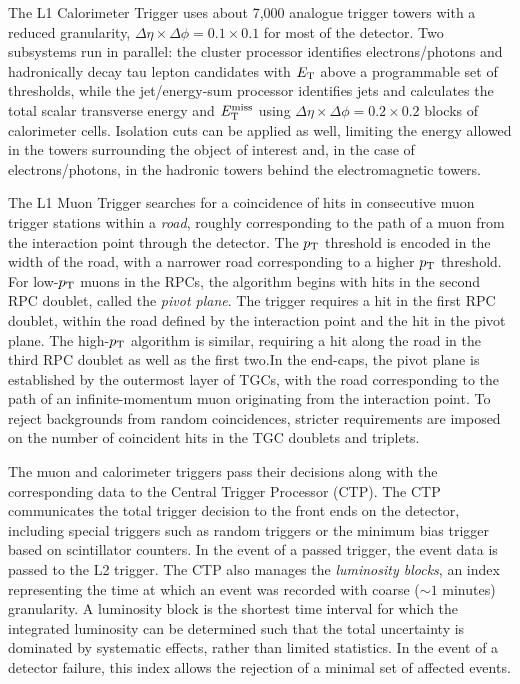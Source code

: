 The L1 Calorimeter Trigger uses about 7,000 analogue trigger towers with a reduced granularity, $\Delta\eta\times\Delta\phi=0.1\times0.1$ for most of the detector. Two subsystems run in parallel: the cluster processor identifies electrons/photons and hadronically decay tau lepton candidates with $E_{\mathrm{T}}$ above a programmable set of thresholds, while the jet/energy-sum processor identifies jets and calculates the total scalar transverse energy and $E_{\text{T}}^{\text{miss}}$ using $\Delta\eta\times\Delta\phi=0.2\times0.2$ blocks of calorimeter cells. Isolation cuts can be applied as well, limiting the energy allowed in the towers surrounding the object of interest and, in the case of electrons/photons, in the hadronic towers behind the electromagnetic towers. 

The L1 Muon Trigger searches for a coincidence of hits in consecutive muon trigger stations within a \emph{road}, roughly corresponding to the path of a muon from the interaction point through the detector. The $p_{\text{T}}$ threshold is encoded in the width of the road, with a narrower road corresponding to a higher $p_{\text{T}}$ threshold. For low-$p_{\text{T}}$ muons in the RPCs, the algorithm begins with hits in the second RPC doublet, called the \emph{pivot plane}. The trigger requires a hit in the first RPC doublet, within the road defined by the interaction point and the hit in the pivot plane. The high-$p_{\text{T}}$ algorithm is similar, requiring a hit along the road in the third RPC doublet as well as the first two.In the end-caps, the pivot plane is established by the outermost layer of TGCs, with the road corresponding to the path of an infinite-momentum muon originating from the interaction point. To reject backgrounds from random coincidences, stricter requirements are imposed on the number of coincident hits in the TGC doublets and triplets.

The muon and calorimeter triggers pass their decisions along with the corresponding data to the Central Trigger Processor (CTP). The CTP communicates the total trigger decision to the front ends on the detector, including special triggers such as random triggers or the minimum bias trigger based on scintillator counters. In the event of a passed trigger, the event data is passed to the L2 trigger. The CTP also manages the \emph{luminosity blocks}, an index representing the time at which an event was recorded with coarse ($\sim1$ minutes) granularity. A luminosity block is the shortest time interval for which the integrated luminosity can be determined such that the total uncertainty is dominated by systematic effects, rather than limited statistics. In the event of a detector failure, this index allows the rejection of a minimal set of affected events. 


